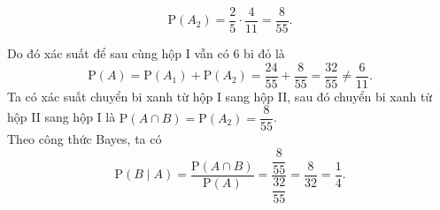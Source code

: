 \begin{ex}
{\begin{itemchoice}
\begin{itemize}
				\[\mathrm{P}\left(A_2\right)=\dfrac{2}{5}\cdot\dfrac{4}{11}=\dfrac{8}{55}.\]
			\end{itemize}
			Do đó xác suất để sau cùng hộp I vẫn có $6$ bi đỏ là \[\mathrm{P}(A)= \mathrm{P}\left(A_1\right)+\mathrm{P}\left(A_2\right)=\dfrac{24}{55}+\dfrac{8}{55}=\dfrac{32}{55} \ne \dfrac{6}{11}.\]
			\itemch Ta có xác suất chuyển bi xanh từ hộp I sang hộp II, sau đó chuyển bi xanh từ hộp II sang hộp I là $\mathrm{P}\left(A\cap B\right)=\mathrm{P}\left(A_2\right)=\dfrac{8}{55}$.\\
			Theo công thức Bayes, ta có
			\[\mathrm{P}(B\mid A)=\dfrac{\mathrm{P}\left(A\cap B\right)}{\mathrm{P}\left(A\right)}= \dfrac{\dfrac{8}{55}}{\dfrac{32}{55}} = \dfrac{8}{32} = \dfrac{1}{4}.\]
		\end{itemchoice}
	}
\end{ex}

